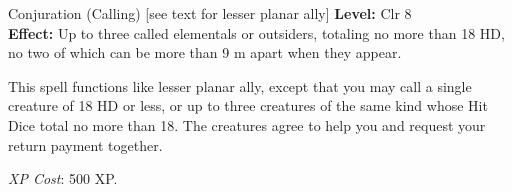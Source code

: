 {Conjuration (Calling) [see text for lesser planar ally]}
{
	\textbf{Level:}
	Clr 8\\
	\textbf{Effect:}
	Up to three called elementals or outsiders, totaling no more than 18 HD, no two of which can be more than 9 m apart when they appear.\\
}
{
	This spell functions like lesser planar ally, except that you may call a single creature of 18 HD or less, or up to three creatures of the same kind whose Hit Dice total no more than 18. The creatures agree to help you and request your return payment together.

	\textit{XP Cost}:
	500 XP.

}
